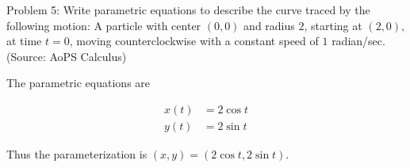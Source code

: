 Problem 5: Write parametric equations to describe the curve traced by the following motion: A particle with center $(0, 0)$ and radius $2$, starting at $(2, 0)$, at time $t = 0$, moving counterclockwise with a constant speed of $1$ radian/sec. (Source: AoPS Calculus)

The parametric equations are

\begin{align*}
x(t) &= 2 \cos t \\
y(t) &= 2 \sin t
\end{align*}

Thus the parameterization is $\boxed{(x, y) = (2 \cos t, 2 \sin t)}$.
